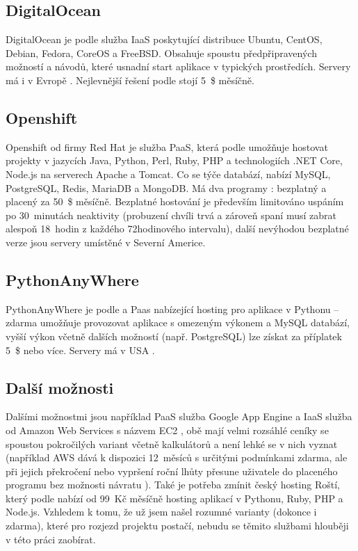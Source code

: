         \subsection{DigitalOcean}
        DigitalOcean je podle \cite{digitalocean1} služba IaaS poskytující distribuce Ubuntu, CentOS, Debian, Fedora, CoreOS a FreeBSD. Obsahuje spoustu předpřipravených možností a návodů, které usnadní start aplikace v typických prostředích. Servery má i v Evropě \cite{digitalocean2}. Nejlevnější řešení podle \cite{digitalocean3} stojí 5~\$ měsíčně.
        
        \subsection{Openshift}
        Openshift od firmy Red Hat je služba PaaS, která podle \cite{openshift1} umožňuje hostovat projekty v jazycích Java, Python, Perl, Ruby, PHP a technologiích .NET Core, Node.js na serverech Apache a Tomcat. Co se týče databází, nabízí MySQL, PostgreSQL, Redis, MariaDB a MongoDB. Má dva programy \cite{openshift2}: bezplatný a placený za 50~\$ měsíčně. Bezplatné hostování je především limitováno uspáním po 30~minutách neaktivity (probuzení chvíli trvá a zároveň spaní musí zabrat alespoň 18~hodin z každého 72hodinového intervalu), další nevýhodou bezplatné verze jsou servery umístěné v Severní Americe.
        
        \subsection{PythonAnyWhere}
        PythonAnyWhere je podle \cite{pythonanywhere1} a \cite{pythonanywhere2} Paas nabízející hosting pro aplikace v Pythonu -- zdarma umožňuje provozovat aplikace s omezeným výkonem a MySQL databází, vyšší výkon včetně dalších možností (např. PostgreSQL) lze získat za příplatek 5~\$ nebo více. Servery má v USA \cite{pythonanywhere3}.
        
        \subsection{Další možnosti}
        Dalšími možnostmi jsou například PaaS služba Google App Engine \cite{googleapp} a IaaS služba od Amazon Web Services s názvem EC2 \cite{aws1}, obě mají velmi rozsáhlé ceníky se spoustou pokročilých variant včetně kalkulátorů a není lehké se v nich vyznat (například AWS dává k dispozici 12~měsíců s určitými podmínkami zdarma, ale při jejich překročení nebo vypršení roční lhůty přesune uživatele do placeného programu bez možnosti návratu \cite{aws2}). Také je potřeba zmínit český hosting Roští, který podle \cite{rosti} nabízí od 99~Kč měsíčně hosting aplikací v Pythonu, Ruby, PHP a Node.js. Vzhledem k tomu, že už jsem našel rozumné varianty (dokonce i zdarma), které pro rozjezd projektu postačí, nebudu se těmito službami hlouběji v této práci zaobírat.

